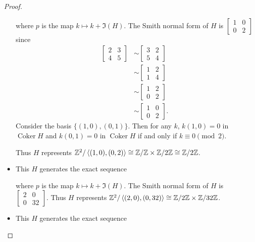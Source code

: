 \documentclass[12pt, psamsfonts]{amsart}
\theoremstyle{definition}
\theoremstyle{remark}
\DeclareMathOperator{\Coker}{Coker}
\numberwithin{equation}{section}
\begin{document}
\begin{proof}
\begin{itemize}
      where $p$ is the map $k \mapsto k + \Im(H)$.
      The Smith normal form of $H$ is $\begin{bmatrix} 1 & 0 \\ 0 & 2 \end{bmatrix}$ since
      \begin{align*}
        \begin{bmatrix} 2 & 3 \\ 4 & 5 \end{bmatrix}
          &\sim \begin{bmatrix} 3 & 2 \\ 5 & 4 \end{bmatrix} \\
          &\sim \begin{bmatrix} 1 & 2 \\ 1 & 4 \end{bmatrix} \\
          &\sim \begin{bmatrix} 1 & 2 \\ 0 & 2 \end{bmatrix} \\
          &\sim \begin{bmatrix} 1 & 0 \\ 0 & 2 \end{bmatrix}.
      \end{align*}
      Consider the basis $\{ (1, 0), (0, 1) \}$.
      Then for any $k$, $k(1, 0) = 0$ in $\Coker{H}$ and $k(0, 1) = 0$ in $\Coker{H}$ if and only if $k \equiv 0 \pmod 2$.

      Thus $H$ represents $\mathbb{Z}^2/\ev{(1, 0), (0, 2)} \cong \mathbb{Z}/\mathbb{Z} \times \mathbb{Z}/2\mathbb{Z} \cong \mathbb{Z}/2\mathbb{Z}$.
    \item
      This $H$ generates the exact sequence

      \begin{center}
      \end{center}

      where $p$ is the map $k \mapsto k + \Im(H)$.
      The Smith normal form of $H$ is $\begin{bmatrix} 2 & 0 \\ 0 & 32 \end{bmatrix}$.
      Thus $H$ represents $\mathbb{Z}^2/\ev{(2, 0), (0, 32)} \cong \mathbb{Z}/2\mathbb{Z} \times \mathbb{Z}/32\mathbb{Z}$.
    \item
      This $H$ generates the exact sequence


\end{itemize}
\end{proof}
\end{document}
